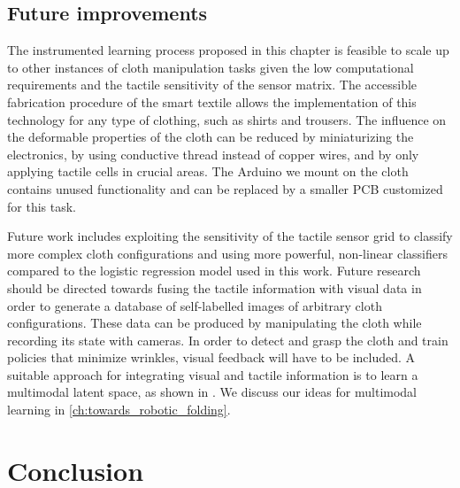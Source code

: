 \documentclass[\home/main.tex]{subfiles}
\begin{document}
\subsection{Future improvements}

The instrumented learning process proposed in this chapter is feasible to scale up to other instances of cloth manipulation tasks given the low computational requirements and the tactile sensitivity of the sensor matrix. The accessible fabrication procedure of the smart textile allows the implementation of this technology for any type of clothing, such as shirts and trousers. The influence on the deformable properties of the cloth can be reduced by miniaturizing the electronics, by using conductive thread instead of copper wires, and by only applying tactile cells in crucial areas. The Arduino we mount on the cloth contains unused functionality and can be replaced by a smaller PCB customized for this task.

Future work includes exploiting the sensitivity of the tactile sensor grid to classify more complex cloth configurations and using more powerful, non-linear classifiers compared to the logistic regression model used in this work. Future research should be directed towards fusing the tactile information with visual data in order to generate a database of self-labelled images of arbitrary cloth configurations. These data can be produced by manipulating the cloth while recording its state with cameras. In order to detect and grasp the cloth and train policies that minimize wrinkles, visual feedback will have to be included. A suitable approach for integrating visual and tactile information is to learn a multimodal latent space, as shown in \autocite{Lee2019}. We discuss our ideas for multimodal learning in \cref{ch:towards_robotic_folding}.



\section{Conclusion} \label{sec:instrumentation_conclusion}
\end{document}
